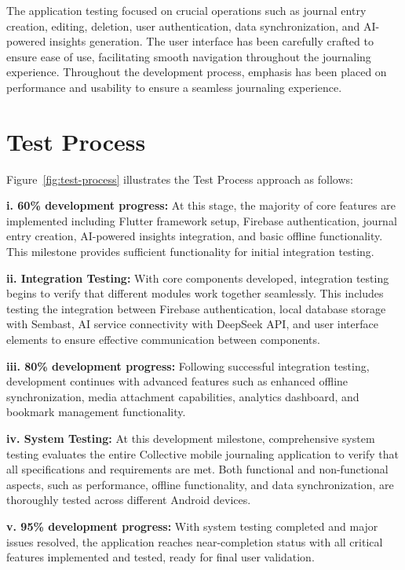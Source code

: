 The application testing focused on crucial operations such as journal entry creation, editing, deletion, user authentication, data synchronization, and AI-powered insights generation. The user interface has been carefully crafted to ensure ease of use, facilitating smooth navigation throughout the journaling experience. Throughout the development process, emphasis has been placed on performance and usability to ensure a seamless journaling experience.

\section{Test Process}\label{sec:testProcess}

Figure~\ref{fig:test-process} illustrates the Test Process approach as follows:

\textbf{i. 60\% development progress:} At this stage, the majority of core features are implemented including Flutter framework setup, Firebase authentication, journal entry creation, AI-powered insights integration, and basic offline functionality. This milestone provides sufficient functionality for initial integration testing.

\textbf{ii. Integration Testing:} With core components developed, integration testing begins to verify that different modules work together seamlessly. This includes testing the integration between Firebase authentication, local database storage with Sembast, AI service connectivity with DeepSeek API, and user interface elements to ensure effective communication between components.

\textbf{iii. 80\% development progress:} Following successful integration testing, development continues with advanced features such as enhanced offline synchronization, media attachment capabilities, analytics dashboard, and bookmark management functionality.

\textbf{iv. System Testing:} At this development milestone, comprehensive system testing evaluates the entire Collective mobile journaling application to verify that all specifications and requirements are met. Both functional and non-functional aspects, such as performance, offline functionality, and data synchronization, are thoroughly tested across different Android devices.

\textbf{v. 95\% development progress:} With system testing completed and major issues resolved, the application reaches near-completion status with all critical features implemented and tested, ready for final user validation.

